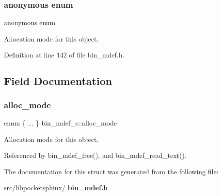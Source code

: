 \subsubsection{anonymous enum}
{\footnotesize\ttfamily anonymous enum}



Allocation mode for this object. 



Definition at line 142 of file bin\+\_\+mdef.\+h.



\subsection{Field Documentation}
\mbox{\label{structbin__mdef__s_ab8d852b6cc4f9899da72da03d1607c92}} 
\subsubsection{alloc\+\_\+mode}
{\footnotesize\ttfamily enum \{ ... \}   bin\+\_\+mdef\+\_\+s\+::alloc\+\_\+mode}



Allocation mode for this object. 



Referenced by bin\+\_\+mdef\+\_\+free(), and bin\+\_\+mdef\+\_\+read\+\_\+text().



The documentation for this struct was generated from the following file\+:\begin{DoxyCompactItemize}
\item 
src/libpocketsphinx/\textbf{ bin\+\_\+mdef.\+h}\end{DoxyCompactItemize}
